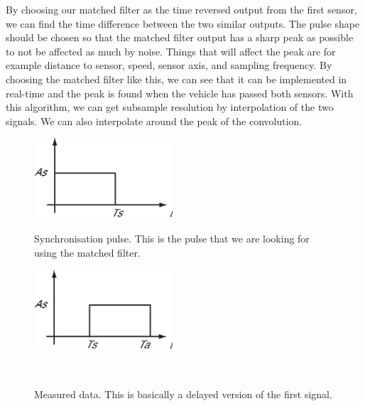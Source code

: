 By choosing our matched filter as the time reversed output from the first sensor, we can find the time difference between the two similar outputs. The pulse shape should be chosen so that the matched filter output has a sharp peak as possible to not be affected as much by noise. Things that will affect the peak are for example distance to sensor, speed, sensor axis, and sampling frequency. By choosing the matched filter like this, we can see that it can be implemented in real-time and the peak is found when the vehicle has passed both sensors. With this algorithm, we can get subsample resolution by interpolation of the two signals. We can also interpolate around the peak of the convolution.

\begin{subfigures}
\begin{figure}[!htbf]
  \centering
  \begin{minipage}{0.45\linewidth}
  \centering
   \includegraphics[height=3cm]{images/conv1}
  \caption[Synchronisation pulse]{Synchronisation pulse. This is the pulse that we are looking for using the matched filter.}
  \label{fig-conv1}
  \end{minipage}\hspace{0.5cm}
  \begin{minipage}{0.45\linewidth}
  \centering
   \includegraphics[height=3cm]{images/conv2}
  \caption[Data stream]{Measured data. This is basically a delayed version of the first signal.\\}
  \label{fig-conv2}
  \end{minipage}\\
   \begin{minipage}{0.45\linewidth}

\end{minipage}
\end{figure}
\end{subfigures}
